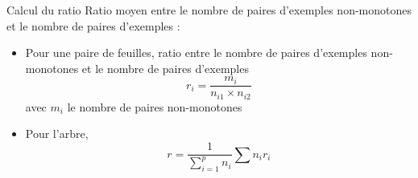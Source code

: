 \documentclass[usenames,dvipsnames]{beamer}
\newcommand{\myfrac}[2]{\frac{\displaystyle {#1}}{\displaystyle {#2}}}
\begin{document}
\begin{frame}{Calcul du ratio}
        Ratio moyen entre le nombre de paires d'exemples non-monotones et le nombre de paires d'exemples :
            \begin{itemize}
            \item Pour une paire de feuilles, ratio entre le nombre de paires d'exemples non-monotones et le nombre de paires d'exemples
                $$ r_i = \myfrac{m_i}{n_{i1} \times n_{i2}}$$
            avec $m_i$ le nombre de paires non-monotones
            \item Pour l'arbre,
                $$ r = \myfrac{1}{\sum_{i=1}^{p} n_i} \sum{n_i}{r_i}$$
            \end{itemize}
    
\end{frame}
\end{document}
